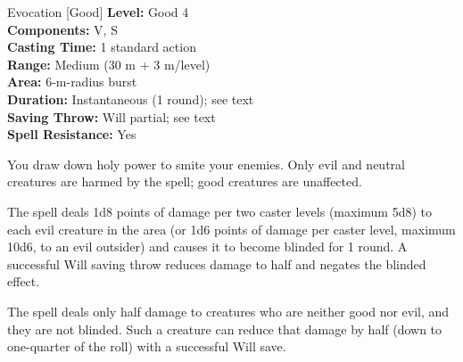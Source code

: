 {Evocation [Good]}
{
	\textbf{Level:}
	Good 4\\
	\textbf{Components:}
	V, S\\
	\textbf{Casting Time:}
	1 standard action\\
	\textbf{Range:}
	Medium (30 m + 3 m/level)\\
	\textbf{Area:}
	6-m-radius burst\\
	\textbf{Duration:}
	Instantaneous (1 round); see text\\
	\textbf{Saving Throw:}
	Will partial; see text\\
	\textbf{Spell Resistance:}
	Yes\\
}
{
	You draw down holy power to smite your enemies. Only evil and neutral creatures are harmed by the spell; good creatures are unaffected.

	The spell deals 1d8 points of damage per two caster levels (maximum 5d8) to each evil creature in the area (or 1d6 points of damage per caster level, maximum 10d6, to an evil outsider) and causes it to become blinded for 1 round. A successful Will saving throw reduces damage to half and negates the blinded effect.

	The spell deals only half damage to creatures who are neither good nor evil, and they are not blinded. Such a creature can reduce that damage by half (down to one-quarter of the roll) with a successful Will save.

}
